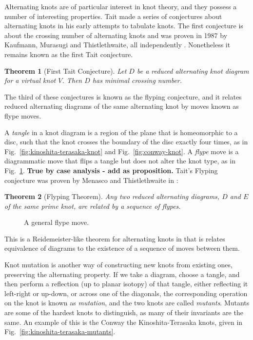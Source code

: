 \documentclass[12pt]{report}
\newcommand{\notered}[1]{{\color{Red} \textbf{#1}}}
\newtheorem*{theorem}{Theorem}
\begin{document}
Alternating knots are of particular interest in knot theory, and they possess a number of interesting properties. Tait made a series of conjectures about alternating knots in his early attempts to tabulate knots. The first conjecture is about the crossing number of alternating knots and was proven in 1987 by Kaufmann, Murasugi and Thistlethwaite, all independently \cite{state-models-jones-polynomial, jones-polynomials-classical-conjectures, spanning-tree-expansion-jones-polynomial}. Nonetheless it remains known as the first Tait conjecture.

\begin{theorem}[First Tait Conjecture]
Let $D$ be a reduced alternating knot diagram for a virtual knot $V$. Then $D$ has minimal crossing number.
\end{theorem}

The third of these conjectures is known as the flyping conjecture, and it relates reduced alternating diagrams of the same alternating knot by moves known as flype moves.

A \textit{tangle} in a knot diagram is a region of the plane that is homeomorphic to a disc, such that the knot crosses the boundary of the disc exactly four times, as in Fig.~\ref{fig:kinoshita-terasaka-knot} and Fig.~\ref{fig:conway-knot}. A \textit{flype} move is a diagrammatic move that flips a tangle but does not alter the knot type, as in Fig.~\ref{fig:flype}. \notered{True by case analysis - add as proposition.} Tait's Flyping conjecture was proven by Menasco and Thistlethwaite in \cite[p. 166]{classification-alternating-links}:

\begin{theorem}[Flyping Theorem]
Any two reduced alternating diagrams, $D$ and $E$ of the same prime knot, are related by a sequence of flypes.
\end{theorem}

\begin{figure}[hbt]
	\centering
	\def\svgscale{0.5}
	
	\caption{A general flype move.}
	\label{fig:flype}
\end{figure}

This is a Reidemeister-like theorem for alternating knots in that is relates equivalence of diagrams to the existence of a sequence of moves between them.

Knot mutation is another way of constructing new knots from existing ones, preserving the alternating property. If we take a diagram, choose a tangle, and then perform a reflection (up to planar isotopy) of that tangle, either reflecting it left-right or up-down, or across one of the diagonals, the corresponding operation on the knot is known as \textit{mutation}, and the two knots are called \textit{mutants}. Mutants are some of the hardest knots to distinguish, as many of their invariants are the same. An example of this is the Conway the Kinoshita-Terasaka knots, given in Fig.~\ref{fig:kinoshita-terasaka-mutants}.
\end{document}

